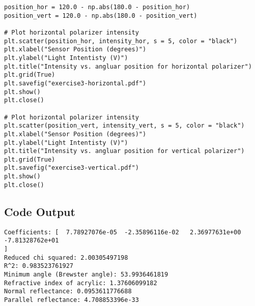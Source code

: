 \begin{lstlisting}
position_hor = 120.0 - np.abs(180.0 - position_hor)
position_vert = 120.0 - np.abs(180.0 - position_vert)

# Plot horizontal polarizer intensity
plt.scatter(position_hor, intensity_hor, s = 5, color = "black")
plt.xlabel("Sensor Position (degrees)")
plt.ylabel("Light Intentisty (V)")
plt.title("Intensity vs. angluar position for horizontal polarizer")
plt.grid(True)
plt.savefig("exercise3-horizontal.pdf")
plt.show()
plt.close()

# Plot horizontal polarizer intensity
plt.scatter(position_vert, intensity_vert, s = 5, color = "black")
plt.xlabel("Sensor Position (degrees)")
plt.ylabel("Light Intentisty (V)")
plt.title("Intensity vs. angluar position for vertical polarizer")
plt.grid(True)
plt.savefig("exercise3-vertical.pdf")
plt.show()
plt.close()
\end{lstlisting}

\subsection*{Code Output}
\begin{lstlisting}
Coefficients: [  7.78927076e-05  -2.35896116e-02   2.36977631e+00  -7.81328762e+01
]
Reduced chi squared: 2.00305497198
R^2: 0.983523761927
Minimum angle (Brewster angle): 53.9936461819
Refractive index of acrylic: 1.37606099182
Normal reflectance: 0.0953611776688
Parallel reflectance: 4.708853396e-33
\end{lstlisting}
